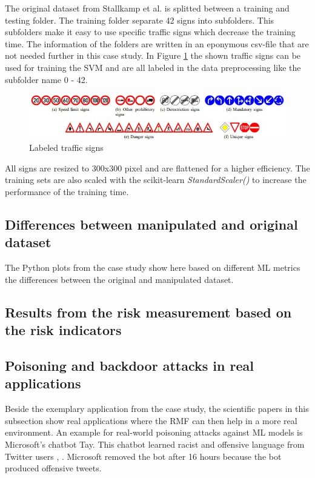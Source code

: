 The original dataset from Stallkamp et al. is splitted between a training and testing folder. The training folder separate 42 signs into subfolders. This subfolders make it easy to use specific traffic signs which decrease the training time. The information of the folders are written in an eponymous csv-file that are not needed further in this case study. In Figure \ref{fig:traffic_signs} the shown traffic signs can be used for training the SVM and are all labeled in the data preprocessing like the subfolder name 0 - 42.

\begin{figure}[h!]
  \centering
  \includegraphics[width=12cm]{pictures/traffic_signs.jpg}
  \caption{Labeled traffic signs \cite{DBLP:conf/ijcnn/StallkampSSI11}}
  \label{fig:traffic_signs}
\end{figure}

All signs are resized to 300x300 pixel and are flattened for a higher efficiency. The training sets are also scaled with the scikit-learn \textit{StandardScaler()} to increase the performance of the training time.

\subsection{Differences between manipulated and original dataset}

The Python plots from the case study show here based on different ML metrics the differences between the original and manipulated dataset.

\subsection{Results from the risk measurement based on the risk indicators}

\subsection{Poisoning and backdoor attacks in real applications}

Beside the exemplary application from the case study, the scientific papers in this subsection show real applications where the RMF can then help in a more real environment. An example for real-world poisoning attacks against ML models is Microsoft's chatbot Tay. This chatbot learned racist and offensive language from Twitter users \cite{DBLP:conf/iciot/BaracaldoCLSZ18}, \cite{DBLP:conf/ccs/BaracaldoCLS17}. Microsoft removed the bot after 16 hours because the bot produced offensive tweets. 
